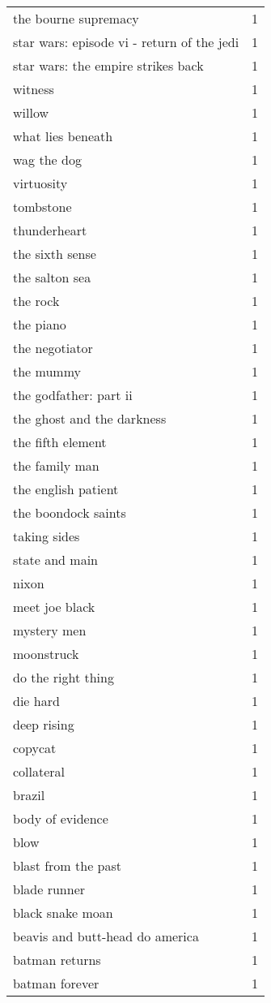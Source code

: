 \begin{tabular}{lr}
the bourne supremacy & 1 \\
star wars: episode vi - return of the jedi & 1 \\
star wars: the empire strikes back & 1 \\
witness & 1 \\
willow & 1 \\
what lies beneath & 1 \\
wag the dog & 1 \\
virtuosity & 1 \\
tombstone & 1 \\
thunderheart & 1 \\
the sixth sense & 1 \\
the salton sea & 1 \\
the rock & 1 \\
the piano & 1 \\
the negotiator & 1 \\
the mummy & 1 \\
the godfather: part ii & 1 \\
the ghost and the darkness & 1 \\
the fifth element & 1 \\
the family man & 1 \\
the english patient & 1 \\
the boondock saints & 1 \\
taking sides & 1 \\
state and main & 1 \\
nixon & 1 \\
meet joe black & 1 \\
mystery men & 1 \\
moonstruck & 1 \\
do the right thing & 1 \\
die hard & 1 \\
deep rising & 1 \\
copycat & 1 \\
collateral & 1 \\
brazil & 1 \\
body of evidence & 1 \\
blow & 1 \\
blast from the past & 1 \\
blade runner & 1 \\
black snake moan & 1 \\
beavis and butt-head do america & 1 \\
batman returns & 1 \\
batman forever & 1 \\

\end{tabular}
